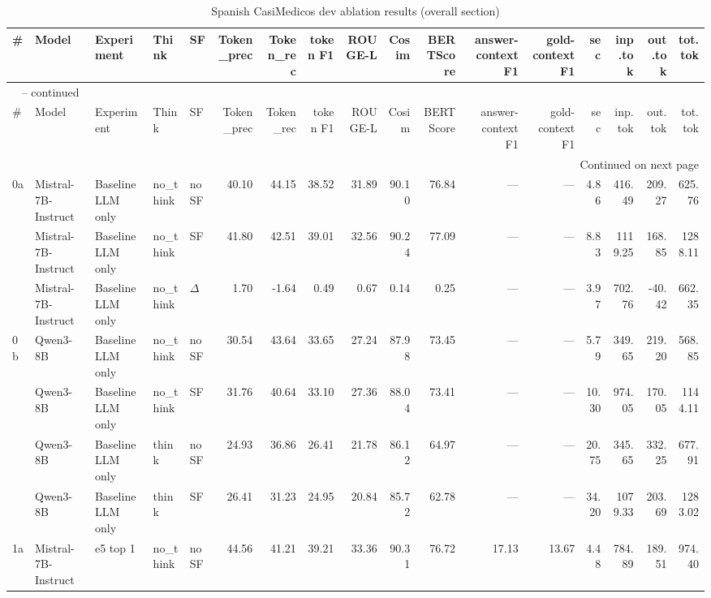\begin{landscape}
\begin{footnotesize}
\setlength{\LTcapwidth}{\linewidth}
\begin{longtable}{l l l l l r r r r r r r r r r r r}
\caption{Spanish CasiMedicos dev ablation results (overall section)} \label{tab:es-casi} \\
\toprule
\# & Model & Experiment & Think & SF & Token\_prec & Token\_rec & token F1 & ROUGE-L & Cosim & BERTScore & answer-context F1 & gold-context F1 & sec & inp.tok & out.tok & tot.tok \\
\midrule
\endfirsthead
\multicolumn{17}{l}{\tablename\ \thetable{} -- continued} \\
\toprule
\# & Model & Experiment & Think & SF & Token\_prec & Token\_rec & token F1 & ROUGE-L & Cosim & BERTScore & answer-context F1 & gold-context F1 & sec & inp.tok & out.tok & tot.tok \\
\midrule
\endhead
\midrule
\multicolumn{17}{r}{Continued on next page} \\
\endfoot
\bottomrule
\endlastfoot
0a & Mistral-7B-Instruct & Baseline LLM only & no\_think & noSF & 40.10 & 44.15 & 38.52 & 31.89 & 90.10 & 76.84 & --- & --- & 4.86 & 416.49 & 209.27 & 625.76 \\
 & Mistral-7B-Instruct & Baseline LLM only & no\_think & SF & 41.80 & 42.51 & 39.01 & 32.56 & 90.24 & 77.09 & --- & --- & 8.83 & 1119.25 & 168.85 & 1288.11 \\
 & Mistral-7B-Instruct & Baseline LLM only & no\_think & $\Delta$ & 1.70 & -1.64 & 0.49 & 0.67 & 0.14 & 0.25 & --- & --- & 3.97 & 702.76 & -40.42 & 662.35 \\
0b & Qwen3-8B & Baseline LLM only & no\_think & noSF & 30.54 & 43.64 & 33.65 & 27.24 & 87.98 & 73.45 & --- & --- & 5.79 & 349.65 & 219.20 & 568.85 \\
 & Qwen3-8B & Baseline LLM only & no\_think & SF & 31.76 & 40.64 & 33.10 & 27.36 & 88.04 & 73.41 & --- & --- & 10.30 & 974.05 & 170.05 & 1144.11 \\
 & Qwen3-8B & Baseline LLM only & think & noSF & 24.93 & 36.86 & 26.41 & 21.78 & 86.12 & 64.97 & --- & --- & 20.75 & 345.65 & 332.25 & 677.91 \\
 & Qwen3-8B & Baseline LLM only & think & SF & 26.41 & 31.23 & 24.95 & 20.84 & 85.72 & 62.78 & --- & --- & 34.20 & 1079.33 & 203.69 & 1283.02 \\
\midrule
1a & Mistral-7B-Instruct & e5 top 1 & no\_think & noSF & 44.56 & 41.21 & 39.21 & 33.36 & 90.31 & 76.72 & 17.13 & 13.67 & 4.48 & 784.89 & 189.51 & 974.40 \\

\end{longtable}
\end{footnotesize}
\end{landscape}
